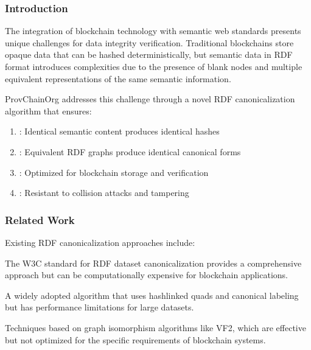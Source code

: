 \documentclass[letterpaper,10pt,english]{sphinxmanual}
\begin{document}
\subsubsection{Introduction}
\label{\detokenize{research/rdf-canonicalization-algorithm:introduction}}
\sphinxAtStartPar
The integration of blockchain technology with semantic web standards presents unique challenges for data integrity verification. Traditional blockchains store opaque data that can be hashed deterministically, but semantic data in RDF format introduces complexities due to the presence of blank nodes and multiple equivalent representations of the same semantic information.

\sphinxAtStartPar
ProvChainOrg addresses this challenge through a novel RDF canonicalization algorithm that ensures:
\begin{enumerate}
%
\item {} 
\sphinxAtStartPar
{}: Identical semantic content produces identical hashes

\item {} 
\sphinxAtStartPar
{}: Equivalent RDF graphs produce identical canonical forms

\item {} 
\sphinxAtStartPar
{}: Optimized for blockchain storage and verification

\item {} 
\sphinxAtStartPar
{}: Resistant to collision attacks and tampering

\end{enumerate}


\subsubsection{Related Work}
\label{\detokenize{research/rdf-canonicalization-algorithm:related-work}}
\sphinxAtStartPar
Existing RDF canonicalization approaches include:
\begin{description}
\sphinxAtStartPar
The W3C standard for RDF dataset canonicalization provides a comprehensive approach but can be computationally expensive for blockchain applications.

\sphinxAtStartPar
A widely adopted algorithm that uses hash\sphinxhyphen{}linked quads and canonical labeling but has performance limitations for large datasets.

\sphinxAtStartPar
Techniques based on graph isomorphism algorithms like VF2, which are effective but not optimized for the specific requirements of blockchain systems.

\end{description}
\end{document}
